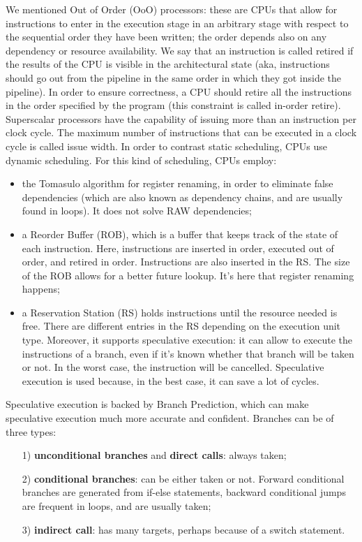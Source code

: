 We mentioned Out of Order (OoO) processors: these are CPUs that allow for instructions to enter in the execution stage in an arbitrary stage with respect to the sequential order they have been written; the order depends also on any dependency or resource availability. We say that an instruction is called retired if the results of the CPU is visible in the architectural state (aka, instructions should go out from the pipeline in the same order in which they got inside the pipeline). In order to ensure correctness, a CPU should retire all the instructions in the order specified by the program (this constraint is called in-order retire).
\nwl
Superscalar processors have the capability of issuing more than an instruction per clock cycle. The maximum number of instructions that can be executed in a clock cycle is called issue width.
\nwl
In order to contrast static scheduling, CPUs use dynamic scheduling. For this kind of scheduling, CPUs employ:
\begin{itemize}
    \item the Tomasulo algorithm for register renaming, in order to eliminate false dependencies (which are also known as dependency chains, and are usually found in loops). It does not solve RAW dependencies;
    \item a Reorder Buffer (ROB), which is a buffer that keeps track of the state of each instruction. Here, instructions are inserted in order, executed out of order, and retired in order. Instructions are also inserted in the RS. The size of the ROB allows for a better future lookup. It's here that register renaming happens;
    \item a Reservation Station (RS) holds instructions until the resource needed is free. There are different entries in the RS depending on the execution unit type. Moreover, it supports speculative execution: it can allow to execute the instructions of a branch, even if it's known whether that branch will be taken or not. In the worst case, the instruction will be cancelled. Speculative execution is used because, in the best case, it can save a lot of cycles. 
\end{itemize}

Speculative execution is backed by Branch Prediction, which can make speculative execution much more accurate and confident. Branches can be of three types:
\begin{itemize}
    \item [1)] \textbf{unconditional branches} and \textbf{direct calls}: always taken;
    \item [2)] \textbf{conditional branches}: can be either taken or not. Forward conditional branches are generated from if-else statements, backward conditional jumps are frequent in loops, and are usually taken;
    \item [3)] \textbf{indirect call}: has many targets, perhaps because of a switch statement.
\end{itemize}

